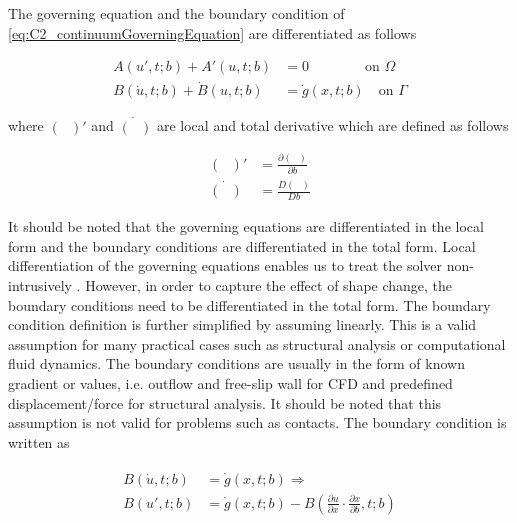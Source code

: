 The governing equation and the boundary condition of \eqref{eq:C2_continuumGoverningEquation} are differentiated as follows

\begin{subequations}\label{eq:C2_continuumSensitivityFormulation}
\begin{align}
	A(u', t; b) + A'(u, t; b) &= 0 \qquad \qquad \text{on } \Omega \\
	B(\dot{u}, t; b) + \dot{B}(u, t; b) &= \dot{g}(x, t; b) \quad \text{on } \Gamma
\end{align}	
\end{subequations}

where $(\text{ })'$ and $\dot{(\text{ })}$ are local and total derivative which are defined as follows

\begin{subequations}
\begin{align*}
	(\text{ })' &= \frac{\partial (\text{ })}{\partial b} \\
	\dot{(\text{ })} &= \frac{D (\text{ })}{D b}
\end{align*}
\end{subequations}

It should be noted that the governing equations are differentiated in the local form and the boundary conditions are differentiated in the total form. Local differentiation of the governing equations enables us to treat the solver non-intrusively \cite{cross2014local}. However, in order to capture the effect of shape change, the boundary conditions need to be differentiated in the total form. The boundary condition definition is further simplified by assuming linearly. This is a valid assumption for many practical cases such as structural analysis or computational fluid dynamics. The boundary conditions are usually in the form of known gradient or values, i.e. outflow and free-slip wall for CFD and predefined displacement/force for structural analysis. It should be noted that this assumption is not valid for problems such as contacts. The boundary condition is written as

\begin{align}\label{eq:C2_linearSAboundaryCondtions}
\begin{split}
	B(\dot{u}, t; b) &= \dot{g}(x, t; b) \Rightarrow \\
	B(u', t; b) &= \dot{g}(x, t; b) - B(\frac{\partial u}{\partial x} \cdot \frac{\partial x}{\partial b}, t; b)
\end{split}
\end{align}

